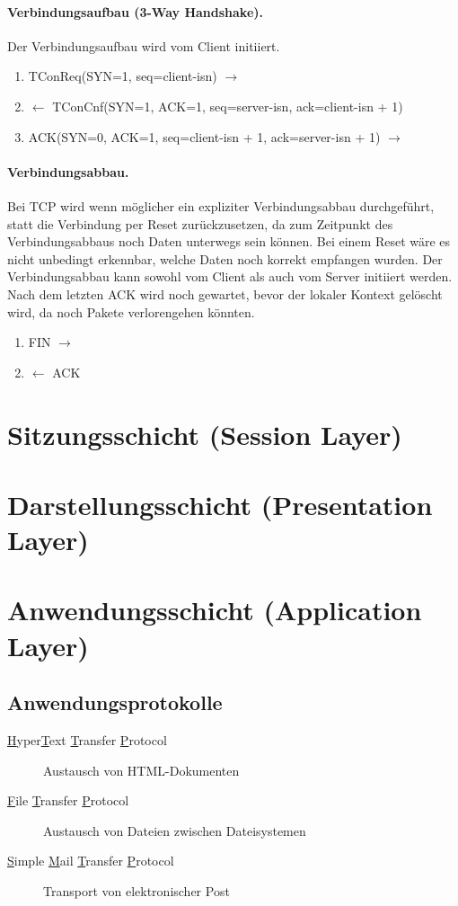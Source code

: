 \documentclass[]{scrartcl}
\begin{document}
\paragraph{Verbindungsaufbau (3-Way Handshake).} Der Verbindungsaufbau wird vom Client initiiert.
\begin{enumerate}
\item TConReq(SYN=1, seq=client-isn) $\rightarrow$
\item $\leftarrow$ TConCnf(SYN=1, ACK=1, seq=server-isn, ack=client-isn + 1)
\item ACK(SYN=0, ACK=1, seq=client-isn + 1, ack=server-isn + 1) $\rightarrow$
\end{enumerate}

\paragraph{Verbindungsabbau.} Bei TCP wird wenn m\"oglicher ein expliziter Verbindungsabbau durchgef\"uhrt, statt die Verbindung per Reset zur\"uckzusetzen, da zum Zeitpunkt des Verbindungsabbaus noch Daten unterwegs sein k\"onnen. Bei einem Reset w\"are es nicht unbedingt erkennbar, welche Daten noch korrekt empfangen wurden. Der Verbindungsabbau kann sowohl vom Client als auch vom Server initiiert werden. Nach dem letzten ACK wird noch gewartet, bevor der lokaler Kontext gel\"oscht wird, da noch Pakete verlorengehen k\"onnten.

\begin{enumerate}
\item FIN $\rightarrow$
\item $\leftarrow$ ACK
\end{enumerate}


\section{Sitzungsschicht (Session Layer)}

\section{Darstellungsschicht (Presentation Layer)}

\section{Anwendungsschicht (Application Layer)}

\subsection{Anwendungsprotokolle}
\begin{description}
\item[\underline{H}yper\underline{T}ext \underline{T}ransfer \underline{P}rotocol] Austausch von HTML-Dokumenten
\item[\underline{F}ile \underline{T}ransfer \underline{P}rotocol] Austausch von Dateien zwischen Dateisystemen
\item[\underline{S}imple \underline{M}ail \underline{T}ransfer \underline{P}rotocol] Transport von elektronischer Post
\end{description}
\end{document}
